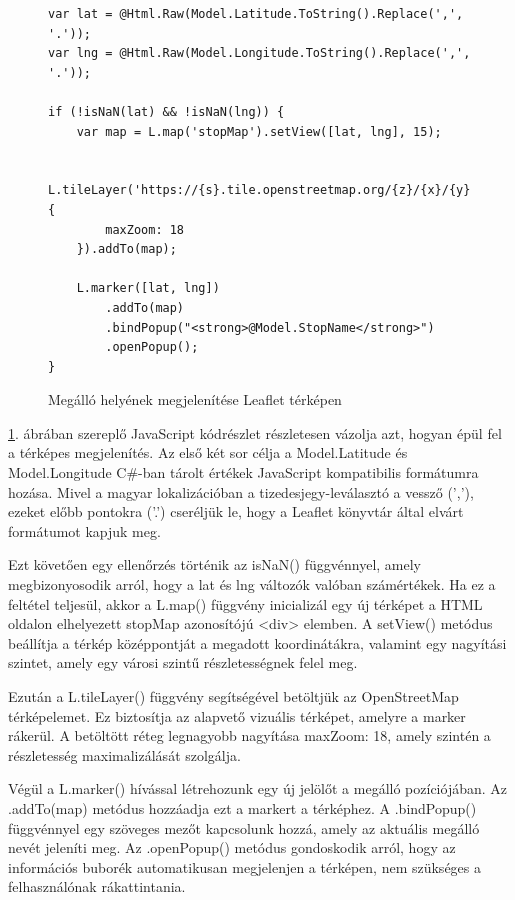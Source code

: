 \begin{figure}[H]
\caption{Megálló helyének megjelenítése Leaflet térképen}
\label{fig:leaflet-stop-map}
\begin{minipage}{\textwidth}
\begin{BVerbatim}
var lat = @Html.Raw(Model.Latitude.ToString().Replace(',', '.'));
var lng = @Html.Raw(Model.Longitude.ToString().Replace(',', '.'));

if (!isNaN(lat) && !isNaN(lng)) {
    var map = L.map('stopMap').setView([lat, lng], 15);

    L.tileLayer('https://{s}.tile.openstreetmap.org/{z}/{x}/{y}.png', {
        maxZoom: 18
    }).addTo(map);

    L.marker([lat, lng])
        .addTo(map)
        .bindPopup("<strong>@Model.StopName</strong>")
        .openPopup();
}
\end{BVerbatim}
\end{minipage}
\end{figure}

\ref{fig:leaflet-stop-map}. ábrában szereplő JavaScript kódrészlet részletesen vázolja azt, hogyan épül fel a térképes megjelenítés. Az első két sor célja a Model.Latitude és Model.Longitude C\#-ban tárolt értékek JavaScript kompatibilis formátumra hozása. Mivel a magyar lokalizációban a tizedesjegy-leválasztó a vessző (','), ezeket előbb pontokra ('.') cseréljük le, hogy a Leaflet könyvtár által elvárt formátumot kapjuk meg.

Ezt követően egy ellenőrzés történik az isNaN() függvénnyel, amely megbizonyosodik arról, hogy a lat és lng változók valóban számértékek. Ha ez a feltétel teljesül, akkor a L.map() függvény inicializál egy új térképet a HTML oldalon elhelyezett stopMap azonosítójú <div> elemben. A setView() metódus beállítja a térkép középpontját a megadott koordinátákra, valamint egy nagyítási szintet, amely egy városi szintű részletességnek felel meg.

Ezután a L.tileLayer() függvény segítségével betöltjük az OpenStreetMap  térképelemet. Ez biztosítja az alapvető vizuális térképet, amelyre a marker rákerül. A betöltött réteg legnagyobb nagyítása maxZoom: 18, amely szintén a részletesség maximalizálását szolgálja.

Végül a L.marker() hívással létrehozunk egy új jelölőt a megálló pozíciójában. Az .addTo(map) metódus hozzáadja ezt a markert a térképhez. A .bindPopup() függvénnyel egy szöveges mezőt kapcsolunk hozzá, amely az aktuális megálló nevét jeleníti meg. Az .openPopup() metódus gondoskodik arról, hogy az információs buborék automatikusan megjelenjen a térképen, nem szükséges a felhasználónak rákattintania.

